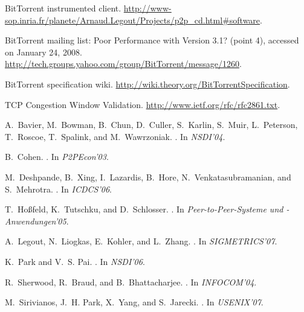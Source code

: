\documentclass[twocolumn,letterpaper,11pt]{article}
\begin{document}
\begin{small}

\begin{thebibliography}{10}

{BitTorrent instrumented client}.
\newblock
  \url{http://www-sop.inria.fr/planete/Arnaud.Legout/Projects/p2p_cd.html#software}.

{BitTorrent mailing list: Poor Performance with Version 3.1? (point 4)},
  accessed on January 24, 2008.
\newblock \url{http://tech.groups.yahoo.com/group/BitTorrent/message/1260}.

{BitTorrent specification wiki}.
\newblock \url{http://wiki.theory.org/BitTorrentSpecification}.

{TCP Congestion Window Validation}.
\newblock \url{http://www.ietf.org/rfc/rfc2861.txt}.

A.~Bavier, M.~Bowman, B.~Chun, D.~Culler, S.~Karlin, S.~Muir, L.~Peterson,
  T.~Roscoe, T.~Spalink, and M.~Wawrzoniak.
.
\newblock In {\em NSDI'04}.

B.~Cohen.
.
\newblock In {\em P2PEcon'03}.

M.~Deshpande, B.~Xing, I.~Lazardis, B.~Hore, N.~Venkatasubramanian, and
  S.~Mehrotra.
.
\newblock In {\em ICDCS'06}.

T.~Ho{\ss}feld, K.~Tutschku, and D.~Schlosser.
.
\newblock In {\em Peer-to-Peer-Systeme und -Anwendungen'05}.

A.~Legout, N.~Liogkas, E.~Kohler, and L.~Zhang.
.
\newblock In {\em SIGMETRICS'07}.

K.~Park and V.~S. Pai.
.
\newblock In {\em NSDI'06}.

R.~Sherwood, R.~Braud, and B.~Bhattacharjee.
.
\newblock In {\em INFOCOM'04}.

M.~Sirivianos, J.~H. Park, X.~Yang, and S.~Jarecki.
.
\newblock In {\em USENIX'07}.

\end{thebibliography}
\end{small}
\end{document}
